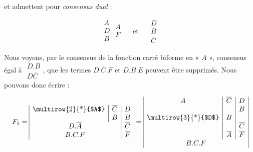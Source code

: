 et admettent pour \textsl{consensus dual} : 

\[ \begin{array}{|c|} 
	A \\ D \\ B \\ 
\end{array} 
      \begin{array}{c|} 
           A \\ F \\ 
      \end{array}   
            \quad \text{ et } \quad 
                  \begin{array}{|c|} D \\ B \\ \overline{C} \end{array} \]

Nous voyons, par le consensus de la fonction carré biforme en « $A$ », consensus égal à $ \begin{array}{|c|} D . B \\ D \overline{C} \end{array}$, que les termes $ D . \overline{C} . F$ et $ D . B  . E $ peuvent être supprimés. Nous pouvons donc écrire : 

 
\[ 
F_1 = \begin{array}{|c|c|c|} 
            $\multirow{2}{*}{$A$}$ & \overline{C} & D \\
                                   &   B          & B \\
            \multicolumn{2}{|c|}{D . \overline{A}} & \overline{C} \\
             \multicolumn{2}{|c|}{B . C . F }   & \overline{F} \\  
             \end{array} 
             = 
           \begin{array}{|c|c|c|} 
                     A & \overline{C} & D \\                    
                      &              & B  \\
                    $\multirow{3}{*}{$D$}$    &       B        &   \\
                     	  &  & \overline{C}  \\
                     	  & \overline{A} & \overline{F}  \\
                    \multicolumn{3}{|c|}{B . C . F }  \\	  
          	\end{array}                          
\]


